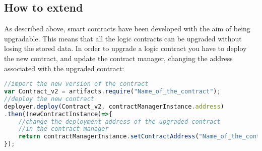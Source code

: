 \subsection{How to extend}
As described above, smart contracts have been developed with the aim of being upgradable. This means that all the logic contracts can be upgraded without losing the stored data. In order to upgrade a logic contract you have to deploy the new contract, and update the contract manager, changing the address associated with the upgraded contract:
\begin{lstlisting}[language=JavaScript]
//import the new version of the contract
var Contract_v2 = artifacts.require("Name_of_the_contract");
//deploy the new contract
deployer.deploy(Contract_v2, contractManagerInstance.address)
.then((newContractInstance)=>{
	//change the deployment address of the upgraded contract
	//in the contract manager
	return contractManagerInstance.setContractAddress("Name_of_the_contract", newContractInstance.address);
});
\end{lstlisting}

